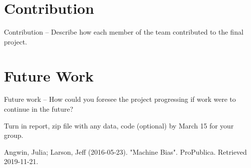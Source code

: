\documentclass[11pt, sigconf]{acmart}
\begin{document}
\section{Contribution}
Contribution – Describe how each member of the team contributed to the final project.


\section{Future Work}
Future work – How could you foresee the project progressing if work were to continue in the
future?


Turn in report, zip file with any data, code (optional) by March 15 for your group.

\begin{thebibliography}{1}

Angwin, Julia; Larson, Jeff (2016-05-23). "Machine Bias". ProPublica. Retrieved 2019-11-21.

\end{thebibliography}
\end{document}
